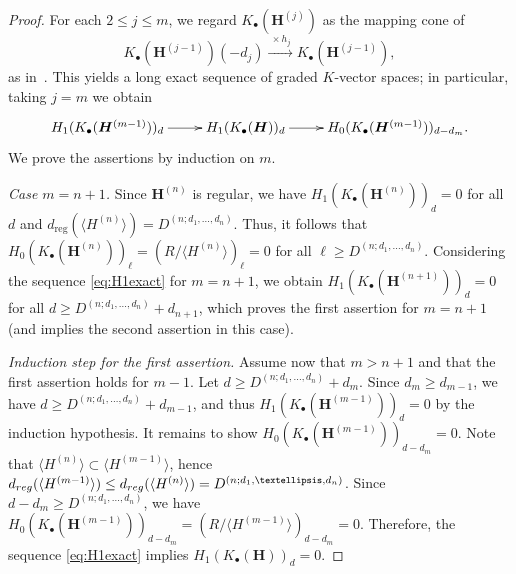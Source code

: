 \documentclass{article}
\theoremstyle{definition}
\theoremstyle{plain}
\theoremstyle{plain}
\theoremstyle{plain}
\theoremstyle{plain}
\numberwithin{equation}{subsection}
\begin{document}
\begin{proof}
For each $2\le j\le m$, we regard $K_\bullet(\bm{H}^{(j)})$ as the mapping cone of
\[
K_\bullet(\bm{H}^{(j-1)})(-d_j)\xrightarrow{\ \times h_j\ } K_\bullet(\bm{H}^{(j-1)}),
\]
as in~\cite{Diem2}.
This yields a long exact sequence of graded $K$-vector spaces; in particular, taking $j=m$ we obtain
\begin{equation}\label{eq:H1exact}
\xymatrix{
H_{1}(K_\bullet(\bm{H}^{(m-1)}))_{d} \ar[r] &
H_{1}(K_\bullet(\bm{H}))_{d} \ar[r] &
H_{0}(K_\bullet(\bm{H}^{(m-1)}))_{d-d_{m}} .
}
\end{equation}
We prove the assertions by induction on $m$.

\medskip\noindent
\emph{Case $m=n+1$.}
Since $\bm{H}^{(n)}$ is regular, we have $H_1(K_{\bullet}(\bm{H}^{(n)}))_d=0$ for all $d$ and $d_{\mathrm{reg}}(\langle H^{(n)}\rangle)=D^{(n;d_1,\ldots,d_n)}$.
Thus, it follows that $H_0(K_{\bullet}(\bm{H}^{(n)}))_{\ell}=(R/\langle H^{(n)}\rangle)_{\ell}=0$ for all $\ell \ge D^{(n;d_1,\ldots,d_n)}$.
Considering the sequence \eqref{eq:H1exact} for $m=n+1$, we obtain $H_1(K_{\bullet}(\bm{H}^{(n+1)}))_d=0$ for all $d\ge D^{(n;d_1,\ldots,d_n)}+d_{n+1}$, which proves the first assertion for $m=n+1$ (and implies the second assertion in this case).

\medskip\noindent
\emph{Induction step for the first assertion.}
Assume now that $m>n+1$ and that the first assertion holds for $m-1$.
Let $d\ge D^{(n;d_1,\ldots,d_n)}+d_m$.
Since $d_m\ge d_{m-1}$, we have $d\ge D^{(n;d_1,\ldots,d_n)}+d_{m-1}$, and thus $H_1(K_\bullet(\bm{H}^{(m-1)}))_d=0$ by the induction hypothesis.
It remains to show $H_0(K_\bullet(\bm{H}^{(m-1)}))_{d-d_m}=0$.
Note that $\langle {H}^{(n)}\rangle\subset \langle{H}^{(m-1)}\rangle$, hence $d_{\rm reg}(\langle {H}^{(m-1)}\rangle)\le d_{\rm reg}(\langle {H}^{(n)}\rangle)=D^{(n;d_1,\ldots,d_n)}$.
Since $d-d_m\ge D^{(n;d_1,\ldots,d_n)}$, we have $H_0(K_{\bullet}(\bm{H}^{(m-1)}))_{d-d_m}=(R/\langle {H}^{(m-1)}\rangle)_{d-d_m}=0$.
Therefore, the sequence \eqref{eq:H1exact} implies $H_1(K_{\bullet}(\bm{H}))_d=0$.


\end{proof}
\end{document}
